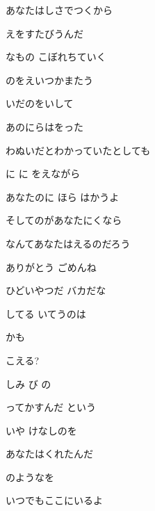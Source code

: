 \documentclass[14pt]{extreport}
\begin{document}
{  あなたはしさでつくから
  \jisho{}

  えをすたびうんだ
  \jisho{}

  なもの こぼれちていく
  \jisho{}

\item
  のをえいつかまたう
  \jisho{}

  いだのをいして
  \jisho{}

  あのにらはをった
  \jisho{}

  わぬいだとわかっていたとしても
  \jisho{}

\item
  に に をえながら
  \jisho{}

  あなたのに ほら はかうよ
  \jisho{}

\item
  そしてのがあなたにくなら
  \jisho{}

  なんてあなたはえるのだろう
  \jisho{}

  ありがとう ごめんね
  \jisho{}

  ひどいやつだ バカだな
  \jisho{}

  してる いてうのは
  \jisho{}

  かも
  \jisho{}

  こえる?
  \jisho{}

\item
  しみ び の
  \jisho{}

  ってかすんだ という
  \jisho{}

  いや けなしのを
  \jisho{}

  あなたはくれたんだ
  \jisho{}

  のようなを
  \jisho{}

  いつでもここにいるよ
  \jisho{}


}
\end{document}
